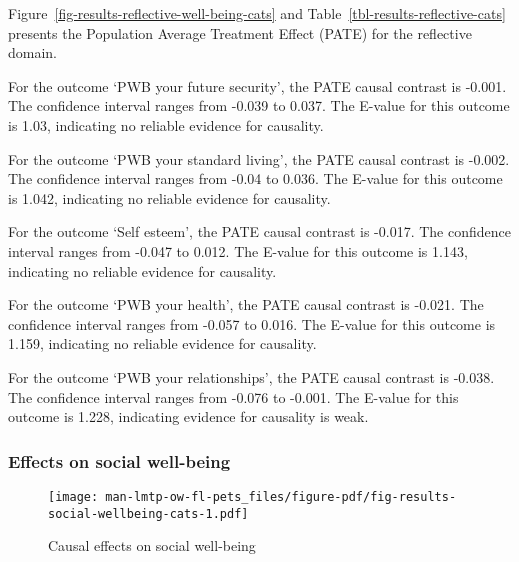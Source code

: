 \documentclass[
  singlecolumn,
  9pt]{article}
\begin{document}
Figure~\ref{fig-results-reflective-well-being-cats} and
Table~\ref{tbl-results-reflective-cats} presents the Population Average
Treatment Effect (PATE) for the reflective domain.

For the outcome `PWB your future security', the PATE causal contrast is
-0.001. The confidence interval ranges from -0.039 to 0.037. The E-value
for this outcome is 1.03, indicating no reliable evidence for causality.

For the outcome `PWB your standard living', the PATE causal contrast is
-0.002. The confidence interval ranges from -0.04 to 0.036. The E-value
for this outcome is 1.042, indicating no reliable evidence for
causality.

For the outcome `Self esteem', the PATE causal contrast is -0.017. The
confidence interval ranges from -0.047 to 0.012. The E-value for this
outcome is 1.143, indicating no reliable evidence for causality.

For the outcome `PWB your health', the PATE causal contrast is -0.021.
The confidence interval ranges from -0.057 to 0.016. The E-value for
this outcome is 1.159, indicating no reliable evidence for causality.

For the outcome `PWB your relationships', the PATE causal contrast is
-0.038. The confidence interval ranges from -0.076 to -0.001. The
E-value for this outcome is 1.228, indicating evidence for causality is
weak.

\newpage{}

\subsubsection{Effects on social
well-being}\label{effects-on-social-well-being}

\begin{figure}

{\centering \texttt{[image: man-lmtp-ow-fl-pets\_files/figure-pdf/fig-results-social-wellbeing-cats-1.pdf]}

}

\caption{\label{fig-results-social-wellbeing-cats}Causal effects on
social well-being}

\end{figure}

\newpage{}
\end{document}
